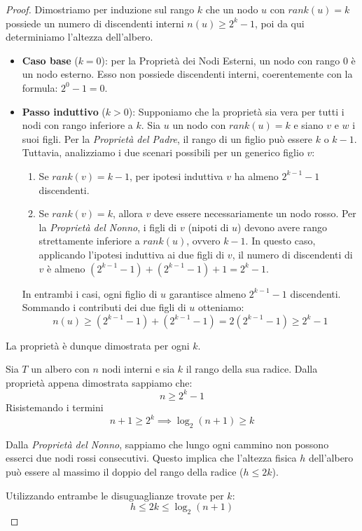 \begin{proof}
Dimostriamo per induzione sul rango $k$ che un nodo $u$ con $rank(u) = k$ possiede un numero di discendenti interni $n(u) \geq 2^k - 1$, poi da qui determiniamo l'altezza dell'albero.

\begin{itemize}
    \item \textbf{Caso base} ($k = 0$): per la Proprietà dei Nodi Esterni, un nodo con rango $0$ è un nodo esterno. Esso non possiede discendenti interni, coerentemente con la formula: $2^0 - 1 = 0$.
    
    \item \textbf{Passo induttivo} ($k > 0$): Supponiamo che la proprietà sia vera per tutti i nodi con rango inferiore a $k$. Sia $u$ un nodo con $rank(u) = k$ e siano $v$ e $w$ i suoi figli. 
    Per la \textit{Proprietà del Padre}, il rango di un figlio può essere $k$ o $k-1$. Tuttavia, analizziamo i due scenari possibili per un generico figlio $v$:
    \begin{enumerate}
        \item Se $rank(v) = k-1$, per ipotesi induttiva $v$ ha almeno $2^{k-1}-1$ discendenti.
        \item Se $rank(v) = k$, allora $v$ deve essere necessariamente un nodo rosso. Per la \textit{Proprietà del Nonno}, i figli di $v$ (nipoti di $u$) devono avere rango strettamente inferiore a $rank(u)$, ovvero $k-1$. In questo caso, applicando l'ipotesi induttiva ai due figli di $v$, il numero di discendenti di $v$ è almeno $(2^{k-1}-1) + (2^{k-1}-1) + 1 = 2^k - 1$.
    \end{enumerate}
    
    In entrambi i casi, ogni figlio di $u$ garantisce almeno $2^{k-1}-1$ discendenti. \\
    Sommando i contributi dei due figli di $u$ otteniamo:
        \[ n(u) \geq (2^{k-1} - 1) + (2^{k-1} - 1)  = 2 (2^{k-1} - 1) \geq 2^k - 1 \]
\end{itemize}
La proprietà è dunque dimostrata per ogni $k$.\;

Sia $T$ un albero con $n$ nodi interni e sia $k$ il rango della sua radice. Dalla proprietà appena dimostrata sappiamo che:
\[ n \geq 2^k - 1 \]
Risistemando i termini
\[ n + 1 \geq 2^k \implies \log_2(n+1) \geq k \]

Dalla \textit{Proprietà del Nonno}, sappiamo che lungo ogni cammino non possono esserci due nodi rossi consecutivi. Questo implica che l'altezza fisica $h$ dell'albero può essere al massimo il doppio del rango della radice ($h \leq 2k$). 

Utilizzando entrambe le disuguaglianze trovate per $k$:
\[ h \leq 2k \leq \log_2(n+1) \]
\end{proof}


